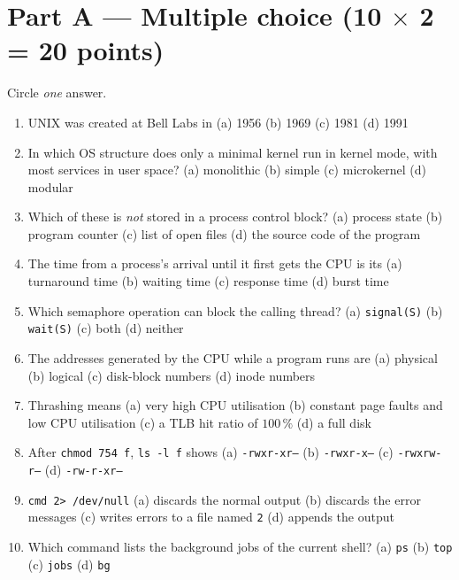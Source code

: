 \documentclass[11pt,a4paper]{article}
\begin{document}
\section*{Part A --- Multiple choice \hfill (10 $\times$ 2 = 20 points)}
Circle \emph{one} answer.
\begin{enumerate}[leftmargin=1.8em,label=A\arabic*.,itemsep=0.35em]
  \item UNIX was created at Bell Labs in \quad (a) 1956 \quad (b) 1969 \quad (c) 1981 \quad (d) 1991
  \item In which OS structure does only a minimal kernel run in kernel mode, with most services in user space? \quad (a) monolithic \quad (b) simple \quad (c) microkernel \quad (d) modular
  \item Which of these is \emph{not} stored in a process control block? \quad (a) process state \quad (b) program counter \quad (c) list of open files \quad (d) the source code of the program
  \item The time from a process's arrival until it first gets the CPU is its \quad (a) turnaround time \quad (b) waiting time \quad (c) response time \quad (d) burst time
  \item Which semaphore operation can block the calling thread? \quad (a) \texttt{signal(S)} \quad (b) \texttt{wait(S)} \quad (c) both \quad (d) neither
  \item The addresses generated by the CPU while a program runs are \quad (a) physical \quad (b) logical \quad (c) disk-block numbers \quad (d) inode numbers
  \item Thrashing means \quad (a) very high CPU utilisation \quad (b) constant page faults and low CPU utilisation \quad (c) a TLB hit ratio of $100\,\%$ \quad (d) a full disk
  \item After \texttt{chmod 754 f}, \texttt{ls -l f} shows \quad (a) \texttt{-rwxr-xr--} \quad (b) \texttt{-rwxr-x---} \quad (c) \texttt{-rwxrw-r--} \quad (d) \texttt{-rw-r-xr--}
  \item \texttt{cmd 2> /dev/null} \quad (a) discards the normal output \quad (b) discards the error messages \quad (c) writes errors to a file named \texttt{2} \quad (d) appends the output
  \item Which command lists the background jobs of the current shell? \quad (a) \texttt{ps} \quad (b) \texttt{top} \quad (c) \texttt{jobs} \quad (d) \texttt{bg}
\end{enumerate}

\end{document}
